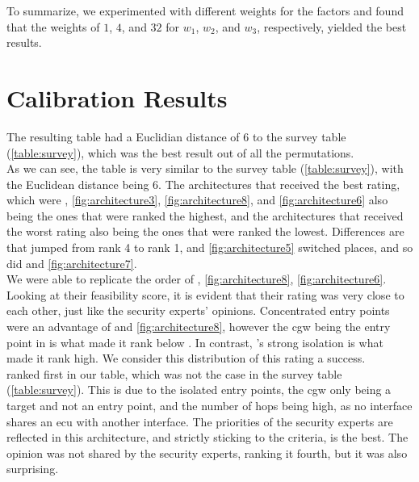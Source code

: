 To summarize, we experimented with different weights for the factors and found that the weights of 
$1$, $4$, and $32$ for $w_{1}$, $w_{2}$, and $w_{3}$, respectively, yielded the best results.


\section{Calibration Results}
\label{sec:calibration}

The resulting table had a Euclidian distance of 6 to the survey table (\ref{table:survey}), which was the best result out of all the permutations.\\

As we can see, the table is very similar to the survey table (\ref{table:survey}), with the Euclidean distance being 6.
The architectures that received the best rating, which were 
, \ref{fig:architecture3}, \ref{fig:architecture8}, and \ref{fig:architecture6} 
also being the ones that were ranked the highest,
and the architectures that received the worst rating also being the ones that were ranked the lowest.
Differences are that  jumped from rank 4 to rank 1,  and \ref{fig:architecture5} switched places, 
and so did  and \ref{fig:architecture7}.\\

We were able to replicate the order of , \ref{fig:architecture8}, \ref{fig:architecture6}.
Looking at their feasibility score, it is evident that their rating was very close to each other, just like the security experts' opinions.
Concentrated entry points were an advantage of  and \ref{fig:architecture8}, 
however the \acrshort{cgw} being the entry point in  is what made it rank below .
In contrast, 's strong isolation is what made it rank high.
We consider this distribution of this rating a success.\\

 ranked first in our table, which was not the case in the survey table (\ref{table:survey}).
This is due to the isolated entry points, the \acrshort{cgw} only being a target and not an entry point, 
and the number of hops being high, as no interface shares an \acrshort{ecu} with another interface.
The priorities of the security experts are reflected in this architecture, and
strictly sticking to the criteria,  is the best.
The opinion was not shared by the security experts, ranking it fourth, but it was also surprising.\\

